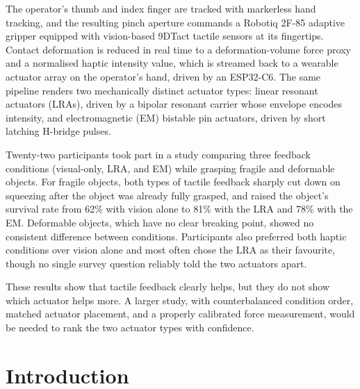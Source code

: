 \documentclass[12pt, a4paper, twoside, openright]{report}
\begin{document}
The operator's thumb and index finger are tracked with markerless hand
tracking, and the resulting pinch aperture commands a Robotiq 2F-85 adaptive
gripper equipped with vision-based 9DTact tactile sensors at its fingertips.
Contact deformation is reduced in real time to a deformation-volume force
proxy and a normalised haptic intensity value, which is streamed back to a
wearable actuator array on the operator's hand, driven by an ESP32-C6. The
same pipeline renders two mechanically distinct actuator types: linear
resonant actuators (LRAs), driven by a bipolar resonant carrier whose envelope
encodes intensity, and electromagnetic (EM) bistable pin actuators, driven by
short latching H-bridge pulses.

Twenty-two participants took part in a study comparing three feedback
conditions (visual-only, LRA, and EM) while grasping fragile and deformable
objects. For fragile objects, both types of tactile feedback sharply cut down
on squeezing after the object was already fully grasped, and raised the
object's survival rate from 62\% with vision alone to 81\% with the LRA and
78\% with the EM. Deformable objects, which have no clear breaking point,
showed no consistent difference between conditions. Participants also
preferred both haptic conditions over vision alone and most often chose the
LRA as their favourite, though no single survey question reliably told the two
actuators apart.

These results show that tactile feedback clearly helps, but they do not show
which actuator helps more. A larger study, with counterbalanced condition
order, matched actuator placement, and a properly calibrated force
measurement, would be needed to rank the two actuator types with confidence.

\cleardoublepage

\tableofcontents
\cleardoublepage
\listoffigures
\cleardoublepage
\listoftables
\cleardoublepage

\setcounter{page}{1}

\chapter{Introduction}
\label{ch:introduction}
\end{document}
